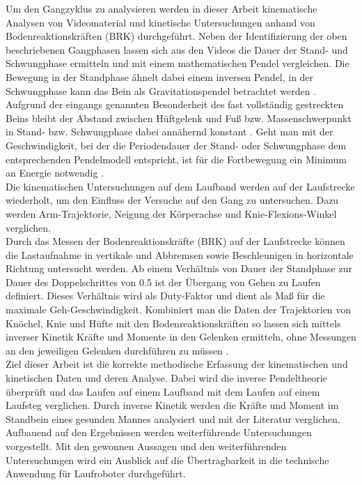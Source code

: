 Um den Gangzyklus zu analysieren werden in dieser Arbeit kinematische Analysen von Videomaterial und kinetische Untersuchungen anhand von Bodenreaktionskräften (BRK) durchgeführt. Neben der Identifizierung der oben beschriebenen Gangphasen lassen sich aus den Videos die Dauer der Stand- und Schwungphase ermitteln und mit einem mathematischen Pendel vergleichen. Die Bewegung in der Standphase ähnelt dabei einem inversen Pendel, in der Schwungphase kann das Bein als Gravitationspendel betrachtet werden \parencite{mochon1980ballistic}. Aufgrund der eingangs genannten Besonderheit des fast vollständig gestreckten Beins bleibt der Abstand zwischen Hüftgelenk und Fuß bzw. Massenschwerpunkt in Stand- bzw. Schwungphase dabei annähernd konstant \parencite{witte1992mechanische}. Geht man mit der Geschwindigkeit, bei der die Periodendauer der Stand- oder Schwungphase dem entsprechenden Pendelmodell entspricht, ist für die Fortbewegung ein Minimum an Energie notwendig \parencite{kuo2007six}.\\
Die kinematischen Untersuchungen auf dem Laufband werden auf der Laufstrecke wiederholt, um den Einfluss der Versuche auf den Gang zu untersuchen. Dazu werden Arm-Trajektorie, Neigung der Körperachse und Knie-Flexions-Winkel verglichen.\\
Durch das Messen der Bodenreaktionskräfte (BRK) auf der Laufstrecke können die Lastaufnahme in vertikale und Abbremsen sowie Beschleunigen in horizontale Richtung untersucht werden. Ab einem Verhältnis von Dauer der Standphase zur Dauer des Doppelschrittes von 0.5 ist der Übergang von Gehen zu Laufen definiert. Dieses Verhältnis wird als Duty-Faktor und dient als Maß für die maximale Geh-Geschwindigkeit. Kombiniert man die Daten der Trajektorien von Knöchel, Knie und Hüfte mit den Bodenreaktionskräften so lassen sich mittels inverser Kinetik Kräfte und Momente in den Gelenken ermitteln, ohne Messungen an den jeweiligen Gelenken durchführen zu müssen \parencite{winter2009biomechanics}.\\
Ziel dieser Arbeit ist die korrekte methodische Erfassung der kinematischen und kinetischen Daten und deren Analyse. Dabei wird die inverse Pendeltheorie überprüft und das Laufen auf einem Laufband mit dem Laufen auf einem Laufsteg verglichen. Durch inverse Kinetik werden die Kräfte und Moment im Standbein eines gesunden Mannes analysiert und mit der Literatur verglichen.\\
Aufbauend auf den Ergebnissen werden weiterführende Untersuchungen vorgestellt. Mit den gewonnen Aussagen und den weiterführenden Untersuchungen wird ein Ausblick auf die Übertragbarkeit in die technische Anwendung für Laufroboter durchgeführt.